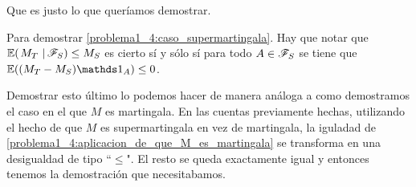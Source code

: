 	Que es justo lo que queríamos demostrar.\par\null
	
	Para demostrar \eqref{problema1_4:caso_supermartingala}. Hay que notar que $ \espc{M_T}{\F_S}\leq M_S $ es cierto sí y sólo sí para todo $A \in \mathscr{F}_S$
	se tiene que $ \E((M_T - M_S) \indic_{A}) \leq 0 $.\par\null
	
	Demostrar esto último lo podemos hacer de manera análoga a como demostramos el caso en el que $M$ es martingala. En las cuentas previamente hechas,
	utilizando el hecho de que $M$ es supermartingala en vez de martingala, la iguladad de \eqref{problema1_4:aplicacion_de_que_M_es_martingala} 
	se transforma en una desigualdad de tipo ``$\leq$". El resto se queda exactamente igual y entonces tenemos la demostración que necesitabamos.